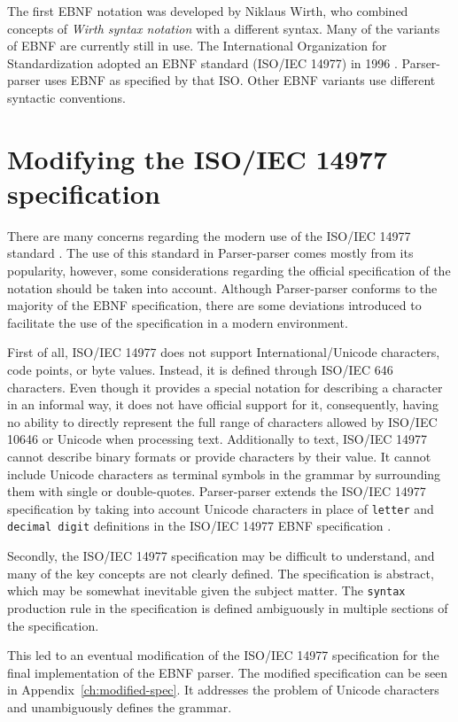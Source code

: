 \documentclass[english,bachelors,forcepolishlogotype]{wizthesis}
\newcommand{\thisproject}{Parser-parser}
\begin{document}
The first EBNF notation was developed by Niklaus Wirth, who combined concepts of
\emph{Wirth syntax notation} with a different syntax. Many of the variants of
EBNF are currently still in use. The International Organization for
Standardization adopted an EBNF standard (ISO/IEC 14977) in 1996
\cite{iso-14977}. \thisproject{} uses EBNF as specified by that ISO. Other EBNF
variants use different syntactic conventions.

\section{Modifying the ISO/IEC 14977 specification}
\label{sec:modified-specification}

There are many concerns regarding the modern use of the ISO/IEC 14977 standard
\cite{wheeler-2019}. The use of this standard in \thisproject{} comes mostly
from its popularity, however, some considerations regarding the official
specification of the notation should be taken into account. Although
\thisproject{} conforms to the majority of the EBNF specification, there are
some deviations introduced to facilitate the use of the specification in a
modern environment.

First of all, ISO/IEC 14977 does not support International/Unicode characters,
code points, or byte values. Instead, it is defined through ISO/IEC 646
characters. Even though it provides a special notation for describing a
character in an informal way, it does not have official support for it,
consequently, having no ability to directly represent the full range of
characters allowed by ISO/IEC 10646 or Unicode when processing text.
Additionally to text, ISO/IEC 14977 cannot describe binary formats or provide
characters by their value. It cannot include Unicode characters as terminal
symbols in the grammar by surrounding them with single or double-quotes.
\thisproject{} extends the ISO/IEC 14977 specification by taking into account
Unicode characters in place of \texttt{letter} and \texttt{decimal digit}
definitions in the ISO/IEC 14977 EBNF specification \cite{iso-14977}.

Secondly, the ISO/IEC 14977 specification may be difficult to understand, and
many of the key concepts are not clearly defined. The specification is abstract,
which may be somewhat inevitable given the subject matter. The \texttt{syntax}
production rule in the specification is defined ambiguously in multiple sections
of the specification.

This led to an eventual modification of the ISO/IEC 14977 specification for the
final implementation of the EBNF parser. The modified specification can be seen
in Appendix~\ref{ch:modified-spec}. It addresses the problem of Unicode
characters and unambiguously defines the grammar.
\end{document}

